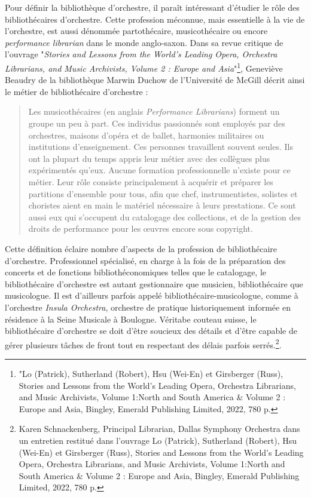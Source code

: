 Pour définir la bibliothèque d'orchestre, il paraît intéressant d'étudier le rôle des bibliothécaires d'orchestre. Cette profession méconnue, mais essentielle à la vie de l'orchestre, est aussi dénommée partothécaire, musicothécaire ou encore\textit{ performance librarian} dans le monde anglo-saxon.
Dans sa revue critique de l'ouvrage "\textit{Stories and Lessons from the World's Leading Opera, Orchestra Librarians, and Music Archivists, Volume 2 : Europe and Asia}"\footnote{"Lo (Patrick), Sutherland (Robert), Hsu (Wei-En) et Girsberger (Russ), Stories and Lessons from the World's Leading Opera, Orchestra Librarians, and Music Archivists, Volume 1:North and South America \& Volume 2 : Europe and Asia, Bingley, Emerald Publishing Limited, 2022, 780 p.}, Geneviève Beaudry de la bibliothèque Marwin Duchow de l'Université de McGill décrit ainsi le métier de bibliothécaire d'orchestre :
\begin{quote}
	Les musicothécaires (en anglais\textit{ Performance Librarians}) forment un groupe un peu à part. Ces individus passionnés sont employés par des orchestres, maisons d'opéra et de ballet, harmonies militaires ou institutions d'enseignement. Ces personnes travaillent souvent seules. Ils ont la plupart du temps appris leur métier avec des collègues plus expérimentés qu'eux. Aucune formation professionnelle n'existe pour ce métier. Leur rôle consiste principalement à acquérir et préparer les partitions d'ensemble pour tous, afin que chef, instrumentistes, solistes et choristes aient en main le matériel nécessaire à leurs prestations. Ce sont aussi eux qui s'occupent du catalogage des collections, et de la gestion des droits de performance pour les œuvres encore sous copyright.
\end{quote}

Cette définition éclaire nombre d'aspects de la profession de bibliothécaire d'orchestre. Professionnel spécialisé, en charge à la fois de la préparation des concerts et de fonctions bibliothéconomiques telles que le catalogage, le bibliothécaire d'orchestre est autant gestionnaire que musicien, bibliothécaire que musicologue. Il est d'ailleurs parfois appelé bibliothécaire-musicologue, comme à l'orchestre \textit{Insula Orchestra}, orchestre de pratique historiquement informée en résidence à la Seine Musicale à Boulogne.
Véritabe couteau suisse, le bibliothécaire d'orchestre se doit d'être soucieux des détails et d'être capable de gérer plusieurs tâches de front tout en respectant des délais parfois serrés.\footnote{Karen Schnackenberg, Principal Librarian, Dallas Symphony Orchestra dans un entretien restitué dans l'ouvrage Lo (Patrick), Sutherland (Robert), Hsu (Wei-En) et Girsberger (Russ), Stories and Lessons from the World's Leading Opera, Orchestra Librarians, and Music Archivists, Volume 1:North and South America \& Volume 2 : Europe and Asia, Bingley, Emerald Publishing Limited, 2022, 780 p.}.

